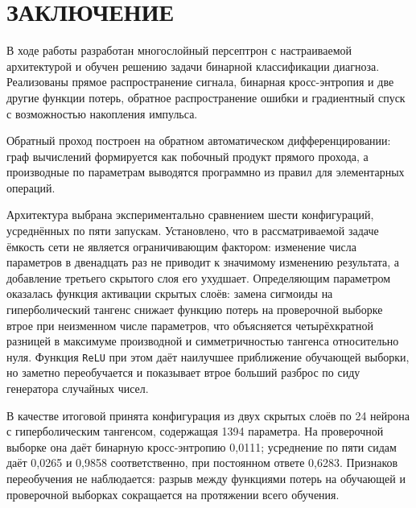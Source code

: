 \chapter{ЗАКЛЮЧЕНИЕ}

В ходе работы разработан многослойный персептрон с настраиваемой архитектурой и обучен
решению задачи бинарной классификации диагноза. Реализованы
прямое распространение сигнала, бинарная кросс-энтропия и две другие функции потерь,
обратное распространение ошибки и градиентный спуск с возможностью накопления импульса.

Обратный проход построен на обратном автоматическом дифференцировании: граф вычислений
формируется как побочный продукт прямого прохода, а производные по параметрам выводятся
программно из правил для элементарных операций. 

Архитектура выбрана экспериментально сравнением шести конфигураций, усреднённых по пяти
запускам. Установлено, что в рассматриваемой задаче ёмкость сети не является
ограничивающим фактором: изменение числа параметров в двенадцать раз не приводит к
значимому изменению результата, а добавление третьего скрытого слоя его ухудшает.
Определяющим параметром оказалась функция активации скрытых слоёв: замена сигмоиды на
гиперболический тангенс снижает функцию потерь на проверочной выборке втрое при
неизменном числе параметров, что объясняется четырёхкратной разницей в максимуме
производной и симметричностью тангенса относительно нуля. Функция \texttt{ReLU} при этом
даёт наилучшее приближение обучающей выборки, но заметно переобучается и показывает
втрое больший разброс по сиду генератора случайных чисел.

В качестве итоговой принята конфигурация из двух скрытых слоёв по 24 нейрона с
гиперболическим тангенсом, содержащая 1394 параметра. На проверочной выборке она даёт
бинарную кросс-энтропию 0,0111; усреднение
по пяти сидам даёт 0,0265 и 0,9858 соответственно, при постоянном ответе 0,6283.
Признаков переобучения не наблюдается: разрыв между функциями потерь на обучающей и
проверочной выборках сокращается на протяжении всего обучения.

